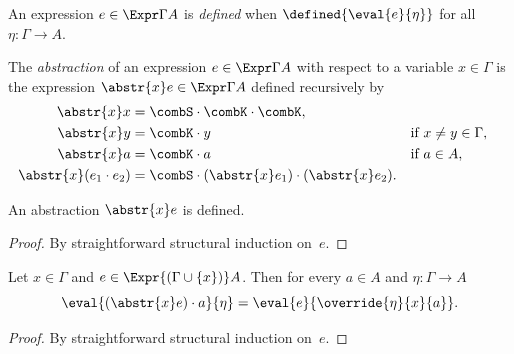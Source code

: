 \begin{definition}
  \label{def:expression-defined}
  \leanok
  An expression $e \in \Expr \Gamma A$ is \emph{defined} when $\defined{\eval{e}{\eta}}$
  for all $\eta : \Gamma \to A$.
\end{definition}


\begin{definition}
  \label{def:abstraction}
  \leanok
  The \emph{abstraction} of an expression $e \in \Expr \Gamma A$ 
  with respect to a variable $x \in \Gamma$
  is the expression $\abstr{x} e \in \Expr \Gamma A$ defined recursively by
  \begin{align*}
    \abstr{x} x &= \combS \cdot \combK \cdot \combK, \\
    \abstr{x} y &= \combK \cdot y &&\text{if $x \neq y \in \Gamma$}, \\
    \abstr{x} a &= \combK \cdot a &&\text{if $a \in A$}, \\
    \abstr{x} (e_1 \cdot e_2) &= \combS \cdot (\abstr{x} e_1) \cdot (\abstr{x} e_2).
  \end{align*}
\end{definition}


\begin{proposition}
  \label{prop:abstraction-defined}
  \leanok
  An abstraction $\abstr{x} e$ is defined.
\end{proposition}

\begin{proof}
  \leanok
  By straightforward structural induction on~$e$.
\end{proof}

\begin{proposition}
  \label{prop:abstraction-equal}
  \leanok
  Let $x \in \Gamma$ and $e \in \Expr {(\Gamma \cup \{x\})} A$.
  Then for every $a \in A$ and $\eta : \Gamma \to A$
  \begin{equation*}
    \eval{(\abstr{x} e) \cdot a}{\eta} =
    \eval{e}{\override{\eta}{x}{a}}.
  \end{equation*}
\end{proposition}

\begin{proof}
  \leanok
  By straightforward structural induction on~$e$.
\end{proof}

